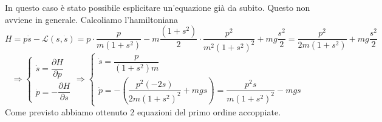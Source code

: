 \begin{example}{}
In questo caso è stato possibile esplicitare un'equazione già da subito.
Questo non avviene in generale.
Calcoliamo l'hamiltoniana
\[
H
=
p\dot{s}-\mathcal{L}(s,\dot{s})
=
p\cdot\frac{p}{m(1+s^2)}
-
m\frac{(1+s^2)}{2}\cdot
\frac{p^2}{m^2(1+s^2)^2}
+
mg\frac{s^2}{2}
=
\frac{p^2}{2m(1+s^2)}
+
mg\frac{s^2}{2}
\]
\[
\Rightarrow
\begin{cases}
\dot{s}=\dfrac{\partial H}{\partial p}\\[6pt]
\dot{p}=-\dfrac{\partial H}{\partial s}
\end{cases}
\Rightarrow
\begin{cases}
\dot{s}=\dfrac{p}{(1+s^2)m}\\[8pt]
\dot{p}
=
-\left(
\dfrac{p^2(-2s)}{2m(1+s^2)^2}
+
mgs
\right)
=
\dfrac{p^2s}{m(1+s^2)^2}
-
mgs
\end{cases}
\]
Come previsto abbiamo ottenuto 2 equazioni del primo ordine accoppiate.
\end{example}
